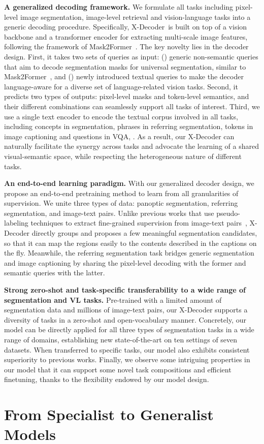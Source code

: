 \documentclass[10pt,twocolumn,letterpaper]{article}
\newcommand{\ourmodel}{X-Decoder}
\begin{document}
\textbf{A generalized decoding framework.} 
We formulate all tasks including pixel-level image segmentation, image-level retrieval and vision-language tasks into a generic decoding procedure. Specifically, \ourmodel~is built on top of a vision backbone and a transformer encoder for extracting multi-scale image features, following the framework of Mask2Former~\cite{cheng2022masked}. The key novelty lies in the decoder design. First, it takes two sets of queries as input: () generic non-semantic queries that aim to decode segmentation masks for universal segmentation, similar to Mask2Former~\cite{cheng2022masked}, and () newly introduced textual queries to make the decoder language-aware for a diverse set of language-related vision tasks. Second, it predicts two types of outputs: pixel-level masks and token-level semantics, and their different combinations can seamlessly support all tasks of interest. Third, we use a single text encoder to encode the textual corpus involved in all tasks, including concepts in segmentation, phrases in referring segmentation, tokens in image captioning and questions in VQA, \etc. As a result, our \ourmodel{} can naturally facilitate the synergy across tasks and advocate the learning of a shared visual-semantic space, while respecting the heterogeneous nature of different tasks. 

\textbf{An end-to-end learning paradigm.} With our generalized decoder design, we propose an end-to-end pretraining method to learn from all granularities of supervision. We unite three types of data: panoptic segmentation, referring segmentation, and image-text pairs. Unlike previous works that use pseudo-labeling techniques to extract fine-grained supervision from image-text pairs~\cite{zhang2022glipv2,ghiasi2021open}, \ourmodel{} directly groups and proposes a few meaningful segmentation candidates, so that it can map the regions easily to the contents described in the captions on the fly. Meanwhile, the referring segmentation task bridges generic segmentation and image captioning by sharing the pixel-level decoding with the former and semantic queries with the latter. 

\textbf{Strong zero-shot and task-specific transferability to a wide range of segmentation and VL tasks.} Pre-trained with a limited amount of segmentation data and millions of image-text pairs, our \ourmodel{} supports a diversity of tasks in a zero-shot and open-vocabulary manner. Concretely, our model can be directly applied for all three types of segmentation tasks in a wide range of domains, establishing new state-of-the-art on ten settings of seven datasets. When transferred to specific tasks, our model also exhibits consistent superiority to previous works. Finally, we observe some intriguing properties in our model that it can support some novel task compositions and efficient finetuning, thanks to the flexibility endowed by our model design. \section{From Specialist to Generalist Models}
\end{document}
